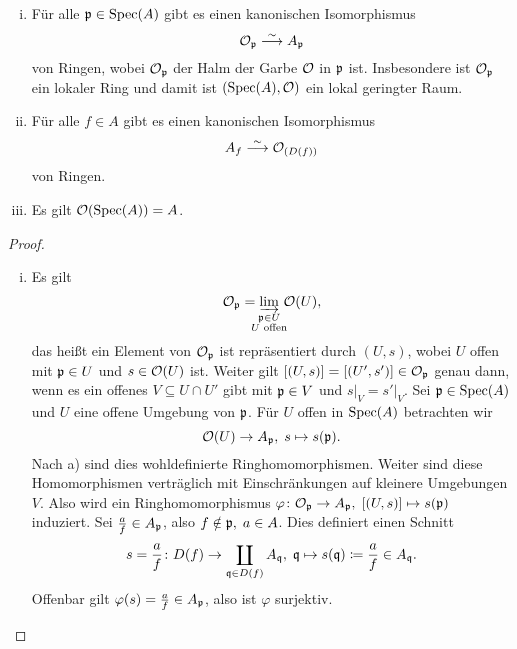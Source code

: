 \begin{prop}
\label{prop:4.12}
	\begin{enumerate}[i)]
		\item Für alle $\mathfrak{p} \in \operatorname{Spec}(A)$ gibt es einen kanonischen Isomorphismus
		\[
			\mathcal{O}_{\mathfrak{p}} \overset{\sim}{\longrightarrow} A_{\mathfrak{p}}
		\]
		von Ringen, wobei $\mathcal{O}_{\mathfrak{p}}$ der Halm der Garbe $\mathcal{O}$ in $\mathfrak{p}$ ist. Insbesondere ist $\mathcal{O}_{\mathfrak{p}}$ ein lokaler Ring und damit ist $(\operatorname{Spec}(A),\mathcal{O})$ ein lokal geringter Raum.
		\item Für alle $f \in A$ gibt es einen kanonischen Isomorphismus
		\[
			A_f \overset{\sim}{\longrightarrow}\mathcal{O}_{(D(f))}
		\]
		von Ringen.
		\item Es gilt $\mathcal{O}(\operatorname{Spec}(A)) = A$.
	\end{enumerate}
	\begin{proof}
		\begin{enumerate}[i)]
			\item Es gilt
			\[
				\mco_\mfp = \varinjlim_{\substackclap{\mfp \in U\\U \text{ offen}}} \, \mco(U),
			\]
			das heißt ein Element von $\mathcal{O}_{\mathfrak{p}}$ ist repräsentiert durch $(U,s)$, wobei $U$ offen mit $\mathfrak{p} \in U$ und $s \in \mathcal{O}(U)$ ist. Weiter gilt $[(U,s)] = [(U',s')] \in \mathcal{O}_{\mathfrak{p}}$ genau dann, wenn es ein offenes $V \subseteq U \cap U'$ gibt mit $\mathfrak{p} \in V$ und $s\vert_V = s'\vert_V$. Sei $\mathfrak{p} \in \operatorname{Spec}(A)$ und $U$ eine offene Umgebung von $\mathfrak{p}$. Für $U$ offen in $\operatorname{Spec}(A)$ betrachten wir
			\[
			 	\mathcal{O}(U) \to A_{\mathfrak{p}},\; s \mapsto s(\mathfrak{p}).
			\]
			Nach a) sind dies wohldefinierte Ringhomomorphismen. Weiter sind diese Homomorphismen verträglich mit Einschränkungen auf kleinere Umgebungen $V$. Also wird ein Ringhomomorphismus $\varphi\colon\mathcal{O}_{\mathfrak{p}} \to A_{\mathfrak{p}},\; [(U,s)] \mapsto s(\mathfrak{p})$ induziert.
			Sei $\frac{a}{f}\in A_{\mathfrak{p}}$, also $f \notin \mathfrak{p},\; a \in A$. Dies definiert einen Schnitt
			\[
				s = \frac{a}{f}\colon D(f) \to \coprod_{\mathfrak{q} \in D(f)} A_{\mathfrak{q}},\; \mathfrak{q} \mapsto s(\mathfrak{q}) \coloneqq \frac{a}{f} \in A_{\mathfrak{q}}.
			\]
			Offenbar gilt $\varphi(s) = \frac{a}{f}\in A_{\mathfrak{p}}$, also ist $\varphi$ surjektiv.


\end{enumerate}
\end{proof}
\end{prop}
